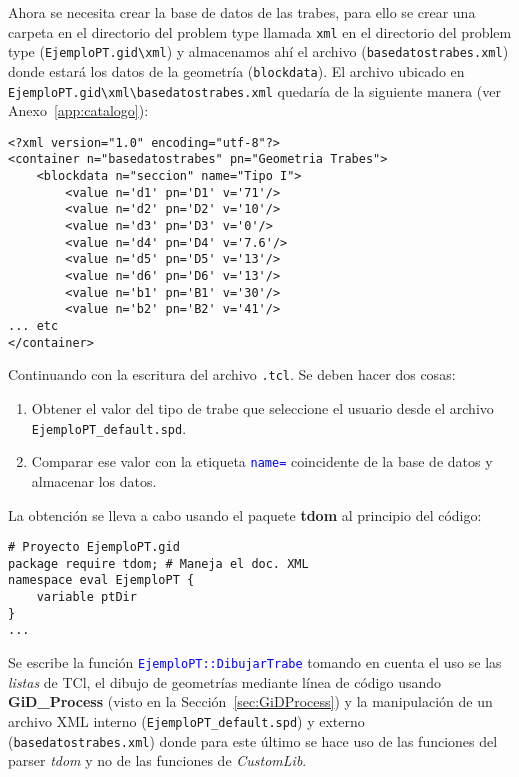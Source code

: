 \documentclass[10pt, a4paper, twocolumn]{article}
\begin{document}
Ahora se necesita crear la base de datos de las trabes, para ello se crear una carpeta en el directorio del problem type llamada \texttt{xml} en el directorio del problem type (\texttt{EjemploPT.gid\textbackslash xml}) y almacenamos ahí el archivo (\texttt{basedatostrabes.xml}) donde estará los datos de la geometría (\texttt{blockdata}). El archivo ubicado en \texttt{EjemploPT.gid\textbackslash xml\textbackslash basedatostrabes.xml} quedaría de la siguiente manera (ver Anexo~\ref{app:catalogo}):


\lstset{language=XML} 
\begin{lstlisting}[caption={Extracto de la base de datos de la geometría.}]
<?xml version="1.0" encoding="utf-8"?>
<container n="basedatostrabes" pn="Geometria Trabes">
	<blockdata n="seccion" name="Tipo I">
		<value n='d1' pn='D1' v='71'/>
		<value n='d2' pn='D2' v='10'/>
		<value n='d3' pn='D3' v='0'/>
		<value n='d4' pn='D4' v='7.6'/>
		<value n='d5' pn='D5' v='13'/>
		<value n='d6' pn='D6' v='13'/>
		<value n='b1' pn='B1' v='30'/>
		<value n='b2' pn='B2' v='41'/>
... etc
</container>
\end{lstlisting}

Continuando con la escritura del archivo \texttt{.tcl}. Se deben hacer dos cosas:

\begin{enumerate}
	\item Obtener el valor del tipo de trabe que seleccione el usuario desde el archivo \texttt{EjemploPT\_default.spd}.
	\item Comparar ese valor con la etiqueta \textcolor{blue}{\texttt{name=}} coincidente de la base de datos y almacenar los datos.
\end{enumerate}

La obtención se lleva a cabo usando el paquete \textbf{tdom} al principio del código:

\lstset{language=tcl} 
\begin{lstlisting}[caption={Código para inicializar el proyecto y crear el menú.}]
# Proyecto EjemploPT.gid
package require tdom; # Maneja el doc. XML
namespace eval EjemploPT {
	variable ptDir
}
...
\end{lstlisting}

Se escribe la función \textcolor{blue}{\texttt{EjemploPT::DibujarTrabe}} tomando en cuenta el uso se las \textit{listas} de TCl, el dibujo de geometrías mediante línea de código usando \textbf{GiD\_Process} (visto en la Sección~\ref{sec:GiDProcess}) y la manipulación de un archivo XML interno (\texttt{EjemploPT\_default.spd}) y externo (\texttt{basedatostrabes.xml}) donde para este último se hace uso de las funciones del parser \textit{tdom} y no de las funciones de \textit{CustomLib}.
\end{document}
